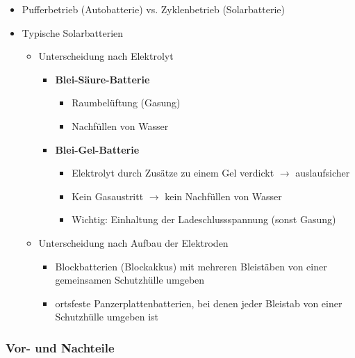 \begin{itemize}
  \item Pufferbetrieb (Autobatterie) vs. Zyklenbetrieb (Solarbatterie)

  \item Typische Solarbatterien
  \begin{itemize}
    \item Unterscheidung nach Elektrolyt
    \begin{itemize}
      \item \textbf{Blei-Säure-Batterie}
      \begin{itemize}
        \item Raumbelüftung (Gasung)
        \item Nachfüllen von Wasser
      \end{itemize}

      \item \textbf{Blei-Gel-Batterie}
      \begin{itemize}
        \item Elektrolyt durch Zusätze zu einem Gel verdickt $\rightarrow$ auslaufsicher
        \item Kein Gasaustritt $\rightarrow$ kein Nachfüllen von Wasser
        \item Wichtig: Einhaltung der Ladeschlussspannung (sonst Gasung)
      \end{itemize}
    \end{itemize}
    \item Unterscheidung nach Aufbau der Elektroden
        \begin{itemize}
        \item Blockbatterien (Blockakkus) mit mehreren Bleistäben von einer gemeinsamen Schutzhülle umgeben
        \item ortsfeste Panzerplattenbatterien, bei denen jeder Bleistab von einer Schutzhülle umgeben ist
      \end{itemize}
  \end{itemize}
\end{itemize}



\subsubsection{Vor- und Nachteile}


